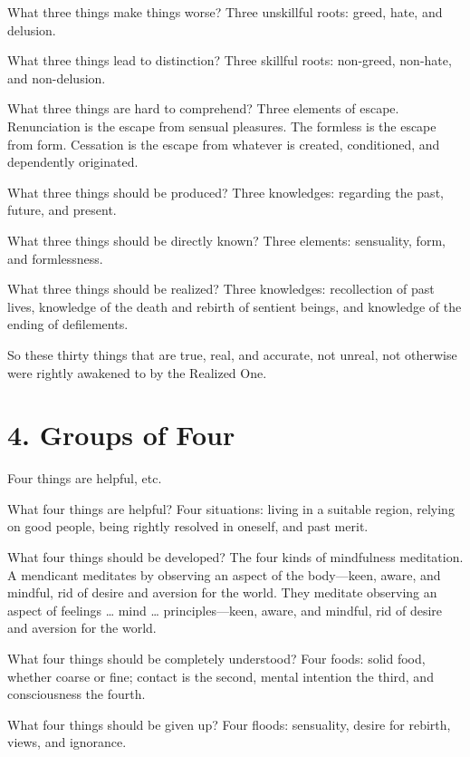 \documentclass[12pt,openany]{book}%
\begin{document}
What three things make things worse? Three unskillful roots: greed, hate, and delusion. 

What three things lead to distinction? Three skillful roots: non-greed, non-hate, and non-delusion. 

What three things are hard to comprehend? Three elements of escape. Renunciation is the escape from sensual pleasures. The formless is the escape from form. Cessation is the escape from whatever is created, conditioned, and dependently originated. 

What three things should be produced? Three knowledges: regarding the past, future, and present. 

What three things should be directly known? Three elements: sensuality, form, and formlessness. 

What three things should be realized? Three knowledges: recollection of past lives, knowledge of the death and rebirth of sentient beings, and knowledge of the ending of defilements. 

So these thirty things that are true, real, and accurate, not unreal, not otherwise were rightly awakened to by the Realized One. 

\section*{4. Groups of Four }

Four things are helpful, etc. 

What four things are helpful? Four situations: living in a suitable region, relying on good people, being rightly resolved in oneself, and past merit. 

What four things should be developed? The four kinds of mindfulness meditation. A mendicant meditates by observing an aspect of the body—keen, aware, and mindful, rid of desire and aversion for the world. They meditate observing an aspect of feelings … mind … principles—keen, aware, and mindful, rid of desire and aversion for the world. 

What four things should be completely understood? Four foods: solid food, whether coarse or fine; contact is the second, mental intention the third, and consciousness the fourth. 

What four things should be given up? Four floods: sensuality, desire for rebirth, views, and ignorance. 
\end{document}
